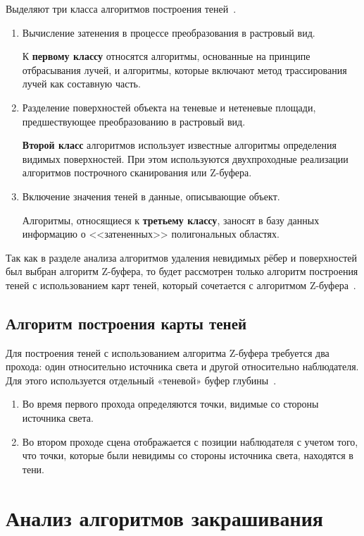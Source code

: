 Выделяют три класса алгоритмов построения теней~\cite{shadow}.
\begin{enumerate}
	\item Вычисление затенения в процессе преобразования в растровый вид.
	
	К \textbf{первому классу} относятся алгоритмы, основанные на принципе
	отбрасывания лучей, и алгоритмы, которые включают метод трассирования
	лучей как составную часть.
	\item Разделение поверхностей объекта на теневые и нетеневые площади, предшествующее преобразованию в растровый вид.
	
	\textbf{Второй класс} алгоритмов использует известные алгоритмы определения
	видимых поверхностей. При этом используются двухпроходные реализации
	алгоритмов построчного сканирования или Z-буфера.
	\item Включение значения теней в данные, описывающие объект.
	
	Алгоритмы, относящиеся к \textbf{третьему классу}, заносят в базу данных
	информацию о <<затененных>> полигональных областях.
\end{enumerate}

Так как в разделе анализа алгоритмов удаления невидимых рёбер и поверхностей был выбран алгоритм Z-буфера, то будет рассмотрен только алгоритм построения теней с использованием карт теней, который сочетается с алгоритмом Z-буфера~\cite{shadow, shadow2}.

\subsection{Алгоритм построения карты теней}

Для построения теней с использованием алгоритма Z-буфера требуется два прохода: один относительно источника света и другой относительно наблюдателя. Для этого используется отдельный «теневой» буфер глубины~\cite{shadow}.
\begin{enumerate}
	\item Во время первого прохода определяются точки, видимые со стороны источника света.
	\item Во втором проходе сцена отображается с позиции наблюдателя с учетом того, что точки, которые были невидимы со стороны источника света, находятся в тени.
\end{enumerate} 

\section{Анализ алгоритмов закрашивания}

